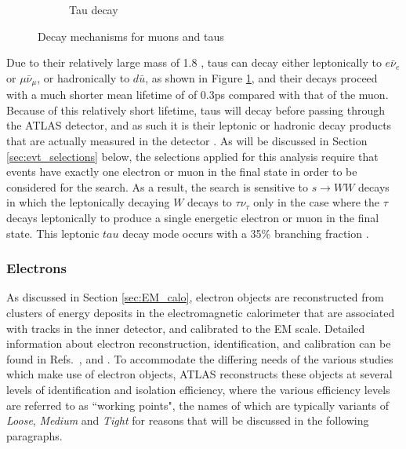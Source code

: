 \begin{figure}[hp]
\begin{subfigure}[t]{0.49\textwidth}
%
%				
%				
%
	\caption{Tau decay}
	\label{fig:tau_decay}
	\end{subfigure}
	\caption{Decay mechanisms for muons and taus}
	\label{fig:lepton_decays}
\end{figure}

Due to their relatively large mass of 1.8 \GeV, taus can decay either leptonically to \(e\bar{\nu}_e\) or \(\mu\bar{\nu}_\mu\), or hadronically to \(d\bar{u}\), as shown in Figure \ref{fig:tau_decay}, and their decays proceed with a much shorter mean lifetime of of 0.3ps compared with that of the muon. Because of this relatively short lifetime, taus will decay before passing through the ATLAS detector, and as such it is their leptonic or hadronic decay products that are actually measured in the detector \cite{ATLAS-CONF-2017-029}. As will be discussed in Section \ref{sec:evt_selections} below, the selections applied for this analysis require that events have exactly one electron or muon in the final state in order to be considered for the search. As a result, the search is sensitive to \(s\rightarrow WW\) decays in which the leptonically decaying \(W\) decays to \(\tau\nu_\tau\) only in the case where the \(\tau\) decays leptonically to produce a single energetic electron or muon in the final state. This leptonic \(tau\) decay mode occurs with a 35\% branching fraction \cite{ATLAS-CONF-2017-029}.

\subsubsection{Electrons}

As discussed in Section \ref{sec:EM_calo}, electron objects are reconstructed from clusters of energy deposits in the electromagnetic calorimeter that are associated with tracks in the inner detector, and calibrated to the EM scale. Detailed information about electron reconstruction, identification, and calibration can be found in Refs.~\cite{ATL-PHYS-PUB-2017-022}, \cite{PERF-2017-01} and \cite{PERF-2017-03}. To accommodate the differing needs of the various studies which make use of electron objects, ATLAS reconstructs these objects at several levels of identification and isolation efficiency, where the various efficiency levels are referred to as ``working points", the names of which are typically variants of \emph{Loose}, \emph{Medium} and \emph{Tight} for reasons that will be discussed in the following paragraphs.

